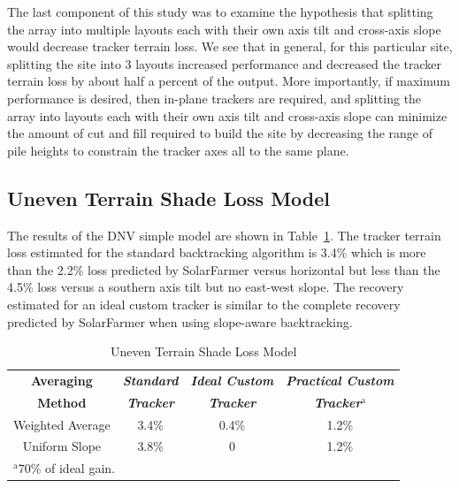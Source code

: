 \documentclass[conference]{IEEEtran}
\begin{document}
The last component of this study was to examine the hypothesis that splitting the array into multiple layouts each with their own axis tilt and cross-axis slope would decrease tracker terrain loss. We see that in general, for this particular site, splitting the site into 3 layouts increased performance and decreased the tracker terrain loss by about half a percent of the output. More importantly, if maximum performance is desired, then in-plane trackers are required, and splitting the array into layouts each with their own axis tilt and cross-axis slope can minimize the amount of cut and fill required to build the site by decreasing the range of pile heights to constrain the tracker axes all to the same plane.

\subsection{Uneven Terrain Shade Loss Model}
The results of the DNV simple model are shown in Table~\ref{table:uneven-terrain}. The tracker terrain loss estimated for the standard backtracking algorithm is 3.4\% which is more than the 2.2\% loss predicted by SolarFarmer versus horizontal but less than the 4.5\% loss versus a southern axis tilt but no east-west slope. The recovery estimated for an ideal custom tracker is similar to the complete recovery predicted by SolarFarmer when using slope-aware backtracking.

\begin{table}[htbp]
\caption{Uneven Terrain Shade Loss Model}
\begin{center}
\begin{tabular}{|c|c|c|c|}
\hline
\textbf{Averaging}& \textbf{\textit{Standard}}& \textbf{\textit{Ideal Custom}} & \textbf{\textit{Practical Custom }} \\
\textbf{Method}   & \textbf{\textit{Tracker}} & \textbf{\textit{Tracker}}      & \textbf{\textit{Tracker$^{\mathrm{a}}$}} \\
\hline
Weighted Average& 3.4\%& 0.4\%& 1.2\% \\
\hline
Uniform Slope   & 3.8\%&     0& 1.2\% \\
\hline
\multicolumn{4}{l}{$^{\mathrm{a}}$70\% of ideal gain.}
\end{tabular}
\label{table:uneven-terrain}
\end{center}
\end{table}
\end{document}
